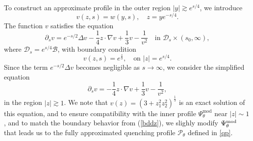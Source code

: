 \documentclass[11pt,reqno]{amsart}
\theoremstyle{definition}
\theoremstyle{bfremark}
\numberwithin{equation}{section}
\begin{document}
To construct an approximate profile in the outer region \(|y|\gtrsim e^{s/4}\), we introduce 
\[
     v(z,s) = w(y, s), \quad z = y e^{-s/4}.
\]
The function \(v\) satisfies the equation
\begin{equation}
    \partial_s v = e^{-s/2} \Delta v - \frac{1}{4} z \cdot \nabla v + \frac{1}{3}v - \frac{1}{v^2} \quad \text{in } \mathcal{D}_s \times (s_0, \infty),
\end{equation}
where \(\mathcal{D}_s = e^{s/4} \mathcal{B}\), with boundary condition
\begin{equation}
    v(z,s) = e^{\frac{s}{3}}, \quad \text{on } |z| = e^{s/4}.\label{bddz}
\end{equation}
Since the term \(e^{-s/2} \Delta v\) becomes negligible as \(s \to \infty\), we consider the simplified equation
\begin{equation} \label{eq:vzs}
    \partial_s v = -\frac{1}{4} z \cdot \nabla v + \frac{1}{3}v - \frac{1}{v^2},
\end{equation}
in the region \(|z| \gtrsim 1\). We note that \(v(z) = (3 + z_1^2 z_2^2)^{\frac{1}{3}}\) is an exact solution of this equation, and to ensure compatibility with the inner profile \(\Psi_{\theta}^{\text{mod}}\) near \(|z| \sim 1\), and to match the boundary behavior from (\ref{bddz}), we slighly modify $\Psi_\theta^{\textup{mod}}$ that leads us to the fully approximated quenching profile \(\mathcal{P}_{\theta}\) defined in \ref{qp}.
\end{document}
